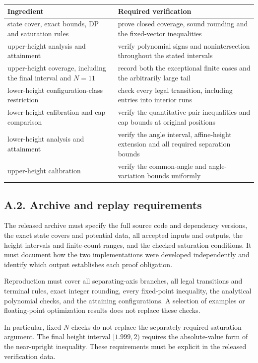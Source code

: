 \documentclass[
  11pt,
  a4paper,
]{article}
\newcounter{none} %
\begin{document}
{\def\LTcaptype{none} %
\begin{longtable}[]{@{}
  >{\raggedright\arraybackslash}p{}
  >{\raggedright\arraybackslash}p{}@{}}
\toprule\noalign{}
\begin{minipage}[b]{\linewidth}\raggedright
Ingredient
\end{minipage} & \begin{minipage}[b]{\linewidth}\raggedright
Required verification
\end{minipage} \\
\midrule\noalign{}
\endhead
\bottomrule\noalign{}
\endlastfoot
state cover, exact bounds, DP and saturation rules & prove closed
coverage, sound rounding and the fixed-vector inequalities \\
upper-height analysis and attainment & verify polynomial signs and
nonintersection throughout the stated intervals \\
upper-height coverage, including the final interval and \(N=11\) &
record both the exceptional finite cases and the arbitrarily large
tail \\
lower-height configuration-class restriction & check every legal
transition, including entries into interior runs \\
lower-height calibration and cap comparison & verify the quantitative
pair inequalities and cap bounds at original positions \\
lower-height analysis and attainment & verify the angle interval,
affine-height extension and all required separation bounds \\
upper-height calibration & verify the common-angle and angle-variation
bounds uniformly \\
\end{longtable}
}

\subsection{A.2. Archive and replay
requirements}\label{a.2.-archive-and-replay-requirements}

The released archive must specify the full source code and dependency
versions, the exact state covers and potential data, all accepted inputs
and outputs, the height intervals and finite-count ranges, and the
checked saturation conditions. It must document how the two
implementations were developed independently and identify which output
establishes each proof obligation.

Reproduction must cover all separating-axis branches, all legal
transitions and terminal rules, exact integer rounding, every
fixed-point inequality, the analytical polynomial checks, and the
attaining configurations. A selection of examples or floating-point
optimization results does not replace these checks.

In particular, fixed-\(N\) checks do not replace the separately required
saturation argument. The final height interval \([1.999,2)\) requires
the absolute-value form of the near-upright inequality. These
requirements must be explicit in the released verification data.
\end{document}
